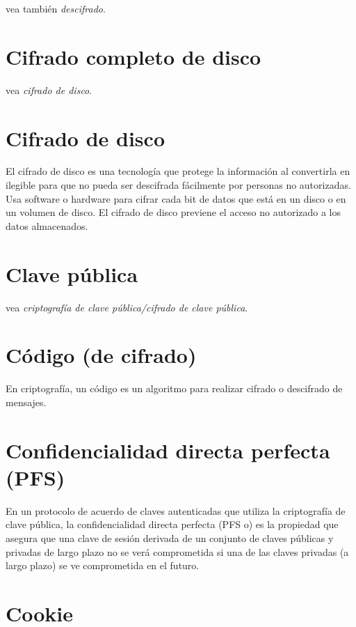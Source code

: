 \documentclass[10pt,a5paper,twoside,,]{book}
\begin{document}
vea también \emph{descifrado}.

\section{Cifrado completo de disco}\label{cifrado-completo-de-disco}

vea \emph{cifrado de disco}.

\section{Cifrado de disco}\label{cifrado-de-disco}

El cifrado de disco es una tecnología que protege la información al
convertirla en ilegible para que no pueda ser descifrada fácilmente por
personas no autorizadas. Usa software o hardware para cifrar cada bit de
datos que está en un disco o en un volumen de disco. El cifrado de disco
previene el acceso no autorizado a los datos almacenados.

\section{Clave pública}\label{clave-puxfablica}

vea \emph{criptografía de clave pública/cifrado de clave pública}.

\section{Código (de cifrado)}\label{cuxf3digo-de-cifrado}

En criptografía, un código es un algoritmo para realizar cifrado o
descifrado de mensajes.

\section{Confidencialidad directa perfecta
(PFS)}\label{confidencialidad-directa-perfecta-pfs}

En un protocolo de acuerdo de claves autenticadas que utiliza la
criptografía de clave pública, la confidencialidad directa perfecta (PFS
o) es la propiedad que asegura que una clave de sesión derivada de un
conjunto de claves públicas y privadas de largo plazo no se verá
comprometida si una de las claves privadas (a largo plazo) se ve
comprometida en el futuro.

\section{Cookie}\label{cookie}
\end{document}
